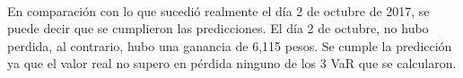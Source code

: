\documentclass[12pt]{article}
\begin{document}
\ \\%
En comparación con lo que sucedió realmente el día 2 de octubre de 2017, se puede decir que se cumplieron las predicciones. El día 2 de octubre, no hubo perdida, al contrario, hubo una ganancia de 6,115 pesos. Se cumple la predicción ya que el valor real no supero en pérdida ninguno de los 3 VaR que se calcularon.
\end{document}
